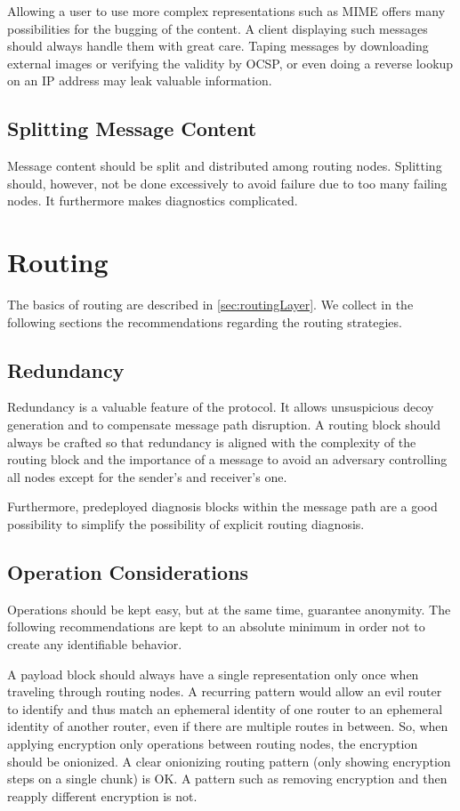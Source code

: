 Allowing a user to use more complex representations such as MIME offers many possibilities for the bugging of the content. A client displaying such messages should always handle them with great care. Taping messages by downloading external images or verifying the validity by OCSP, or even doing a reverse lookup on an IP address may leak valuable information.

\subsection{Splitting Message Content}
Message content should be split and distributed among routing nodes. Splitting should, however, not be done excessively to avoid failure due to too many failing nodes. It furthermore makes diagnostics complicated. 

\section{Routing}
The basics of routing are described in \cref{sec:routingLayer}. We collect in the following sections the recommendations regarding the routing strategies.

\subsection{Redundancy}
Redundancy is a valuable feature of the protocol. It allows unsuspicious decoy generation and to compensate message path disruption. A routing block should always be crafted so that redundancy is aligned with the complexity of the routing block and the importance of a message to avoid an adversary controlling all nodes except for the sender's and receiver's one.

Furthermore, predeployed diagnosis blocks within the message path are a good possibility to simplify the possibility of explicit routing diagnosis.

\subsection{Operation Considerations}
Operations should be kept easy, but at the same time, guarantee anonymity. The following recommendations are kept to an absolute minimum in order not to create any identifiable behavior.

A payload block should always have a single representation only once when traveling through routing nodes. A recurring pattern would allow an evil router to identify and thus match an ephemeral identity of one router to an ephemeral identity of another router, even if there are multiple routes in between. So, when applying encryption only operations between routing nodes, the encryption should be onionized. A clear onionizing routing pattern (only showing encryption steps on a single chunk) is OK. A pattern such as removing encryption and then reapply different encryption is not.

